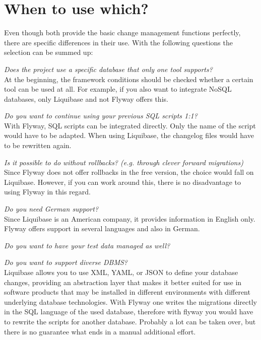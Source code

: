 \newpage
\section{When to use which?}

%
Even though both provide the basic change management functions perfectly,
there are specific differences in their use. With the following questions the selection can be summed up:

\textit{Does the project use a specific database that only one tool supports?}\\
At the beginning, the framework conditions should be checked whether a certain tool can be used at all. For example, if you also want to integrate NoSQL databases, only Liquibase and not Flyway offers this.

\textit{Do you want to continue using your previous SQL scripts 1:1?}\\
With Flyway, SQL scripts can be integrated directly. Only the name of the script would have to be adapted. When using Liquibase, the changelog files would have to be rewritten again.

\textit{Is it possible to do without rollbacks? (e.g. through clever forward migrations)}\\
Since Flyway does not offer rollbacks in the free version, the choice would fall on Liquibase. However, if you can work around this, there is no disadvantage to using Flyway in this regard.

\textit{Do you need German support?}\\
Since Liquibase is an American company, it provides information in English only. Flyway offers support in several languages and also in German.

\textit{Do you want to have your test data managed as well?}\\

\textit{Do you want to support diverse DBMS?}\\
Liquibase allows you to use XML, YAML, or JSON to define your database changes, providing an abstraction layer that makes it better suited for use in software products that may be installed in different environments with different underlying database technologies. With Flyway one writes the migrations directly in the SQL language of the used database, therefore with flyway you would have to rewrite the scripts for another database. Probably a lot can be taken over, but there is no guarantee what ends in a manual additional effort.

